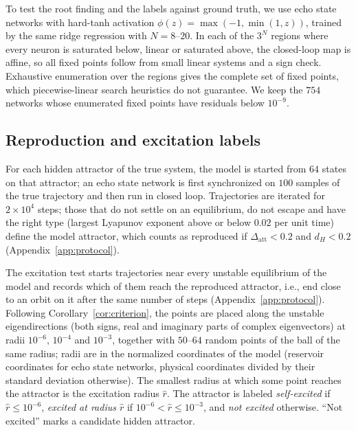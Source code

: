 \documentclass[aip,cha,reprint,amsmath,amssymb,longbibliography]{revtex4-2}
\theoremstyle{definition}
\begin{document}
To test the root finding and the labels against ground truth, we use echo state networks with hard-tanh activation
$\phi(z)=\max(-1,\min(1,z))$, trained by the same ridge regression with $N=8$--$20$. In each of the $3^N$ regions where
every neuron is saturated below, linear or saturated above, the closed-loop map is affine, so all fixed points follow from
small linear systems and a sign check. Exhaustive enumeration over the regions gives the complete set of fixed points,
which piecewise-linear search heuristics do not guarantee.\cite{Eisenmann2023Bifurcations} We keep the $754$ networks whose
enumerated fixed points have residuals below $10^{-9}$.

\subsection{Reproduction and excitation labels}
\label{sec:protocol}

For each hidden attractor of the true system, the model is started from $64$ states on that attractor; an echo state
network is first synchronized on $100$ samples of the true trajectory and then run in closed loop. Trajectories are
iterated for $2\times10^4$ steps; those that do not settle on an equilibrium, do not escape and have the right type (largest
Lyapunov exponent above or below $0.02$ per unit time) define the model attractor, which counts as reproduced if
$\Delta_{\mathrm{att}}<0.2$ and $d_H<0.2$ (Appendix~\ref{app:protocol}).

The excitation test starts trajectories near every unstable equilibrium of the model and records which of them reach the
reproduced attractor, i.e., end close to an orbit on it after the same number of steps (Appendix~\ref{app:protocol}). Following
Corollary~\ref{cor:criterion}, the points are placed along the unstable eigendirections (both signs, real and imaginary parts
of complex eigenvectors) at radii $10^{-6}$, $10^{-4}$ and $10^{-3}$, together with $50$--$64$ random points of the ball of the
same radius; radii are in the normalized coordinates of the model (reservoir coordinates for echo state networks, physical
coordinates divided by their standard deviation otherwise). The smallest radius at which some point reaches the attractor is
the excitation radius $\hat r$. The attractor is labeled \emph{self-excited} if $\hat r\le10^{-6}$, \emph{excited at
radius $\hat r$} if $10^{-6}<\hat r\le10^{-3}$, and \emph{not excited} otherwise. ``Not excited'' marks a candidate hidden
attractor.
\end{document}
